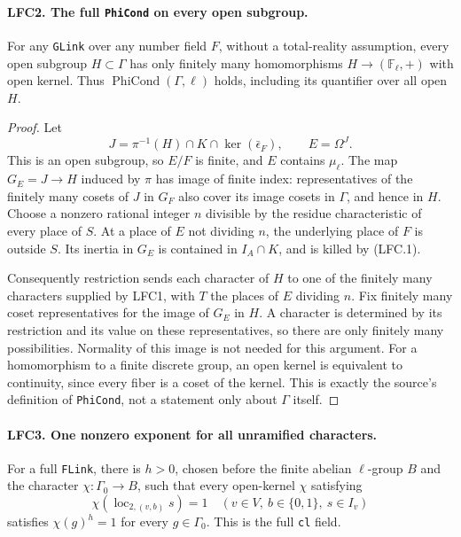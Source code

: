 \paragraph{LFC2. The full \texttt{PhiCond} on every open subgroup.}
\label{claim:LFC2}
For any \texttt{GLink} over any number field \(F\), without
a total-reality assumption, every open subgroup \(H\subset\Gamma\)
has only finitely many homomorphisms \(H\to(\mathbb F_\ell,+)\)
with open kernel.  Thus \(\operatorname{PhiCond}(\Gamma,\ell)\)
holds, including its quantifier over all open \(H\).

\begin{proof}
Let
\[
 J=\pi^{-1}(H)\cap K\cap\ker(\bar\epsilon_F),\qquad
 E=\Omega^J.
\]
This is an open subgroup, so \(E/F\) is finite, and \(E\)
contains \(\mu_\ell\).  The map \(G_E=J\to H\) induced by
\(\pi\) has image of finite index: representatives of the
finitely many cosets of \(J\) in \(G_F\) also cover its image
cosets in \(\Gamma\), and hence in \(H\).
Choose a nonzero rational integer \(n\) divisible by the residue
characteristic of every place of \(S\).
At a place of \(E\) not dividing \(n\), the underlying place of
\(F\) is outside \(S\).  Its inertia in \(G_E\) is contained
in \(I_A\cap K\), and is killed by (LFC.1).

Consequently restriction sends each character of \(H\) to one
of the finitely many characters supplied by LFC1, with \(T\)
the places of \(E\) dividing \(n\).  Fix finitely many coset
representatives for the image of \(G_E\) in \(H\).  A character
is determined by its restriction and its value on these
representatives, so there are only finitely many possibilities.
Normality of this image is not needed for this argument.
For a homomorphism to a finite discrete group, an open kernel
is equivalent to continuity, since every fiber is a coset of
the kernel.  This is exactly the source's definition of
\texttt{PhiCond}, not a statement only about \(\Gamma\) itself.
\end{proof}

\paragraph{LFC3. One nonzero exponent for all unramified characters.}
\label{claim:LFC3}
For a full \texttt{FLink}, there is \(h>0\), chosen before
the finite abelian \(\ell\)-group \(B\) and the character
\(\chi:\Gamma_0\to B\), such that every open-kernel \(\chi\)
satisfying
\[
 \chi(\operatorname{loc}_{2,(v,b)}s)=1
 \quad(v\in V,\ b\in\{0,1\},\ s\in I_v)
                                                        \tag{LFC.5}
\]
satisfies \(\chi(g)^h=1\) for every \(g\in\Gamma_0\).
This is the full \texttt{cl} field.

